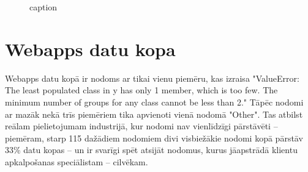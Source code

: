 \begin{figure}[h] 
   \centering
   \caption{caption} 
   \label{fig:askubuntu-xlm-all}
\end{figure}



\section{Webapps datu kopa}


Webapps datu kopā ir nodoms ar tikai vienu piemēru, kas izraisa "ValueError: The least populated class in y has only 1 member, which is too few. The minimum number of groups for any class cannot be less than 2." Tāpēc nodomi ar mazāk nekā trīs piemēriem tika apvienoti vienā nodomā "Other". Tas atbilst reālam pielietojumam industrijā, kur nodomi nav vienlīdzīgi pārstāvēti  -- piemēram, starp 115 dažādiem nodomiem divi visbiežākie nodomi kopā pārstāv 33\% datu kopas \cite{paikens2020} -- un ir svarīgi spēt atsijāt nodomus, kurus jāapstrādā klientu apkalpošanas speciālistam -- cilvēkam.





